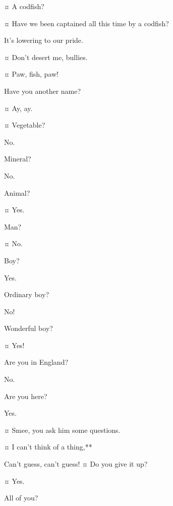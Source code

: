 \begin{drama}
\hookspeaks {}¤
A codfish?

\smeespeaks {}¤
Have we been captained all this time by a codfish?

\starkeyspeaks
It's lowering to our pride.

\hookspeaks {}¤
Don't desert me, bullies.

\peterspeaks {}¤
Paw, fish, paw!


\hookspeaks
Have you another name?

\peterspeaks {}¤
Ay, ay.

\hookspeaks {}¤
Vegetable?

\peterspeaks
No.

\hookspeaks
Mineral?

\peterspeaks
No.

\hookspeaks
Animal?

\peterspeaks {}¤
Yes.

\hookspeaks
Man?

\peterspeaks {}¤
No.

\hookspeaks
Boy?

\peterspeaks
Yes.

\hookspeaks
Ordinary boy?

\peterspeaks
No!

\hookspeaks
Wonderful boy?

\peterspeaks {}¤
Yes!

\hookspeaks
Are you in England?

\peterspeaks
No.

\hookspeaks
Are you here?

\peterspeaks
Yes.

\hookspeaks {}¤
Smee, you ask him some questions.

\smeespeaks {}¤
I can't think of a thing,**

\peterspeaks
Can't guess, can't guess!
¤
Do you give it up?

\hookspeaks {}¤
Yes.

\peterspeaks
All of you?


\end{drama}
